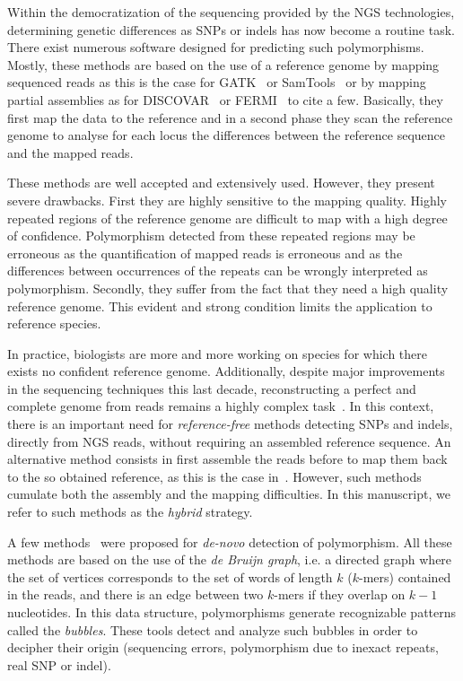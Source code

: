 \documentclass{bmcart}
\begin{document}
Within the democratization of the sequencing provided by the NGS technologies, determining genetic differences as SNPs or indels has now become a routine task.
There exist numerous software designed for predicting such polymorphisms. Mostly, these methods are based on the use of a reference genome by mapping sequenced reads as this is the case for GATK~\cite{gatk} or SamTools~\cite{Li2009} 
 or by mapping partial assemblies as for DISCOVAR~\cite{Weisenfeld2014} or FERMI~\cite{Li2012} to cite a few. Basically, they first map the data to the reference and in a second phase they scan the reference genome to analyse for each locus the differences between the reference sequence and the mapped reads. 

These methods are well accepted and extensively used. However, they present severe drawbacks. First they are highly 
sensitive to the mapping quality. Highly repeated regions of the reference genome are difficult to map with a high degree of confidence.  Polymorphism detected from these repeated regions may be erroneous as the quantification of mapped reads is erroneous and as the differences between occurrences of the repeats can be wrongly interpreted as polymorphism. Secondly, they suffer from the fact that they need a high quality reference genome. This evident and strong condition limits the application to reference species. 

In practice, biologists are more and more working on species for which there exists no confident reference genome. Additionally, despite major improvements in the sequencing techniques this last decade, reconstructing a perfect and complete genome from reads remains a highly complex task~\cite{assemblathon2}. In this context, there is an important need for \emph{reference-free} methods detecting SNPs and indels, directly from NGS reads, without requiring an assembled reference sequence. An alternative method consists in first assemble the reads before to map them back to the so obtained reference, as this is the case in~\cite{Willing2011}. However, such methods cumulate both the assembly and the mapping difficulties. In this manuscript, we refer to such methods as the \emph{hybrid} strategy. 

A few methods~\cite{Peterlongo2010,iqbal2012novo,Leggett2013,Nordstrom2013,Kissplice} were proposed for \emph{de-novo} detection of polymorphism.  All these methods are based on the use of the \emph{de Bruijn graph}, i.e. a directed graph where the set of vertices corresponds to the set of words of length $k$ ($k$-mers) contained in the reads, and there is an edge between two $k$-mers if they overlap on $k-1$ nucleotides. In this data structure, polymorphisms generate recognizable patterns called the \emph{bubbles}. These tools detect and analyze such bubbles in order to decipher their origin (sequencing errors, polymorphism due to inexact repeats, real SNP or indel). 
\end{document}
